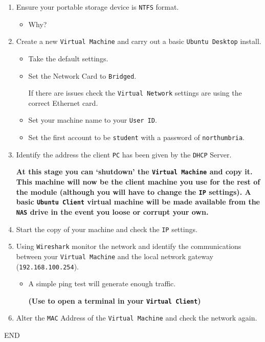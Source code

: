 \documentclass[11pt]{article}
\begin{document}
\begin{enumerate}
    \item Ensure your portable storage device is \texttt{NTFS} format.
    \begin{itemize}
        \item Why?
    \end{itemize} 
    \item Create a new \texttt{Virtual Machine} and carry out a basic \texttt{Ubuntu Desktop} install.
        \begin{itemize}
            \item Take the default settings.
            \item Set the Network Card to \texttt{Bridged}.
            \begin{tcolorbox}[title={\textbf{Note:}}]
                If there are issues check the \texttt{Virtual Network} settings are using the correct Ethernet card.
            \end{tcolorbox}
            \item Set your machine name to your \texttt{User ID}.    
            \item Set the first account to be \texttt{student} with a password of \texttt{northumbria}.    
        \end{itemize}
    \item Identify the address the client \texttt{PC} has been given by the \texttt{DHCP} Server.
    \begin{tcolorbox}[colback=blue!20]
        \textbf{At this stage you can `shutdown' the \texttt{Virtual Machine} and copy it. This machine will now be the client machine you use for the rest of the module (although you will have to change the \texttt{IP} settings). A basic \texttt{Ubuntu Client} virtual machine will be made available from the \texttt{NAS} drive in the event you loose or corrupt your own.}
    \end{tcolorbox}
    \item Start the copy of your machine and check the \texttt{IP} settings.
    \item Using \texttt{Wireshark} monitor the network and identify the communications between your \texttt{Virtual Machine} and the local network gateway (\texttt{192.168.100.254}).
        \begin{itemize}
            \item A simple ping test will generate enough traffic. 
            \begin{tcolorbox}[colback=blue!20]
                \textbf{(Use  to open a terminal in your \texttt{Virtual Client})}
            \end{tcolorbox}
        \end{itemize}
    \item Alter the \texttt{MAC} Address of the \texttt{Virtual Machine} and check the network again.
\end{enumerate}
END
\end{document}
